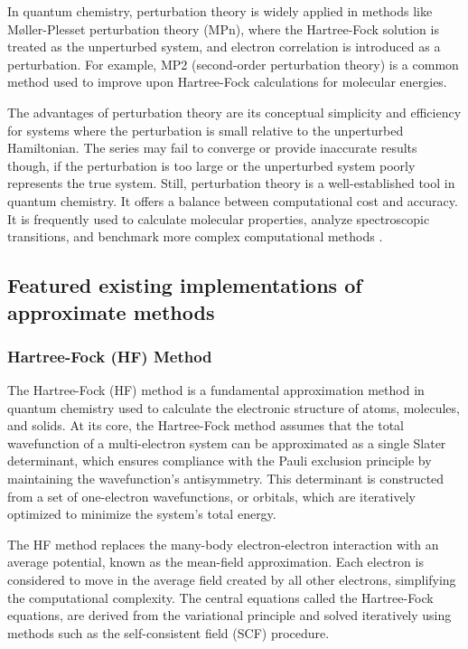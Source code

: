 In quantum chemistry, perturbation theory is widely applied in methods like Møller-Plesset perturbation theory (MPn), where the Hartree-Fock solution is treated as the unperturbed system, and electron correlation is introduced as a perturbation. For example, MP2 (second-order perturbation theory) is a common method used to improve upon Hartree-Fock calculations for molecular energies.

The advantages of perturbation theory are its conceptual simplicity and efficiency for systems where the perturbation is small relative to the unperturbed Hamiltonian. The series may fail to converge or provide inaccurate results though, if the perturbation is too large or the unperturbed system poorly represents the true system. Still, perturbation theory is a well-established tool in quantum chemistry. It offers a balance between computational cost and accuracy. It is frequently used to calculate molecular properties, analyze spectroscopic transitions, and benchmark more complex computational methods \cite{ideas_of_qc}.

\subsection{Featured existing implementations of approximate methods}

\subsubsection{Hartree-Fock (HF) Method}

The Hartree-Fock (HF) method is a fundamental approximation method in quantum chemistry used to calculate the electronic structure of atoms, molecules, and solids. At its core, the Hartree-Fock method assumes that the total wavefunction of a multi-electron system can be approximated as a single Slater determinant, which ensures compliance with the Pauli exclusion principle by maintaining the wavefunction's antisymmetry. This determinant is constructed from a set of one-electron wavefunctions, or orbitals, which are iteratively optimized to minimize the system's total energy.

The HF method replaces the many-body electron-electron interaction with an average potential, known as the mean-field approximation. Each electron is considered to move in the average field created by all other electrons, simplifying the computational complexity. The central equations called the Hartree-Fock equations, are derived from the variational principle and solved iteratively using methods such as the self-consistent field (SCF) procedure. 

